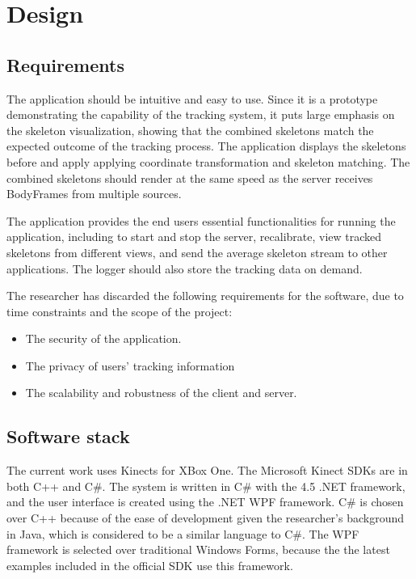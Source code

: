


\chapter{Design}

\label{chapter:design}

\section{Requirements}
\label{sec:design_requirements}

The application should be intuitive and easy to use. Since it is a prototype demonstrating the capability of the tracking system, it puts large emphasis on the skeleton visualization, showing that the combined skeletons match the expected outcome of the tracking process. The application displays the skeletons before and apply applying coordinate transformation and skeleton matching. The combined skeletons should render at the same speed as the server receives BodyFrames from multiple sources. 

The application provides the end users essential functionalities for running the application, including to start and stop the server, recalibrate, view tracked skeletons from different views, and send the average skeleton stream to other applications. The logger should also store the tracking data on demand.

The researcher has discarded the following requirements for the software, due to time constraints and the scope of the project:

\begin{itemize}
  \item The security of the application.
  \item The privacy of users' tracking information
  \item The scalability and robustness of the client and server.
\end{itemize}

\section{Software stack}
\label{sec:design_software_stack}

The current work uses Kinects for XBox One. The Microsoft Kinect SDKs are in both C++ and C\#. The system is written in C\# with the 4.5 .NET framework, and the user interface is created using the .NET WPF framework. C\# is chosen over C++ because of the ease of development given the researcher's background in Java, which is considered to be a similar language to C\#. The WPF framework is selected over traditional Windows Forms, because the the latest examples included in the official SDK use this framework.

